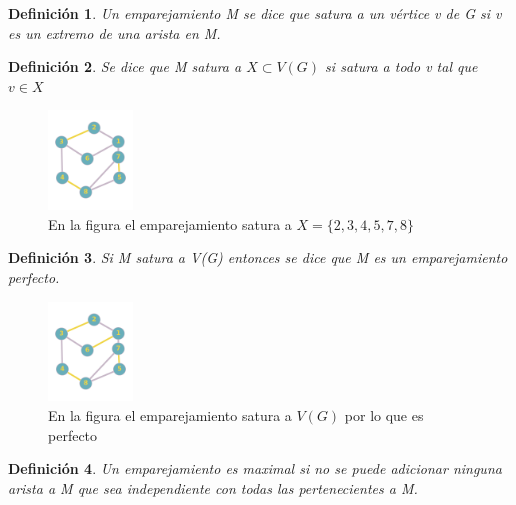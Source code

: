 \documentclass[a4paper,1pt]{report}
\newtheorem*{dfn}{Definición}
\begin{document}
\begin{dfn}
 Un emparejamiento M se dice que satura a un vértice v de G si v es un extremo de una arista en M.
\end{dfn}

\begin{dfn}
 Se dice que M satura a $X\subset V(G)$ si satura a todo v tal que $v\in X$
\end{dfn}

\begin{figure}[H]
        \centering
        \includegraphics[width=0.2\textwidth]{figures7/matching.png}
        \caption{En la figura el emparejamiento satura a $X = \{2,3,4,5,7,8\}$}
    \end{figure} 
    
    \begin{dfn}
        Si M satura a V(G) entonces se dice que M es un emparejamiento perfecto.
    \end{dfn}
    
    \begin{figure}[H]
        \centering
        \includegraphics[width=0.2\textwidth]{figures7/maximo.png}
        \caption{En la figura el emparejamiento satura a $V(G)$ por lo que es perfecto}
\end{figure} 


\begin{dfn}
 Un emparejamiento es maximal si no se puede adicionar ninguna arista a M que sea independiente con todas las pertenecientes a M.
\end{dfn}
\end{document}

